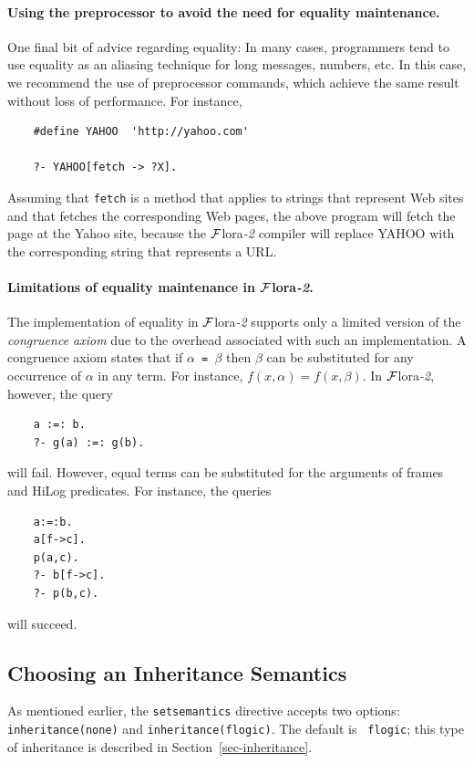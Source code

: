 \documentclass[11pt]{article}
\newcommand{\FLSYSTEM}{{\mbox{\sc ${\cal F}${lora}\rm\emph{-2}}}\xspace}
\begin{document}
\paragraph{Using the preprocessor to avoid the need for equality maintenance.}
One final bit of advice regarding equality: In many cases, programmers tend to use
equality as an aliasing technique for long messages, numbers, etc. In this
case, we recommend the use of preprocessor commands, which achieve the same
result without loss of performance. For instance,

\begin{verbatim}
    #define YAHOO  'http://yahoo.com'  

    ?- YAHOO[fetch -> ?X].
\end{verbatim}
\noindent
Assuming that {\tt fetch} is a method that applies to strings that
represent Web sites and that fetches the corresponding Web pages, the above
program will fetch the page at the Yahoo site, because the \FLSYSTEM compiler will
replace YAHOO with the corresponding string that represents a URL.

\paragraph{Limitations of equality maintenance in \FLSYSTEM.}
The implementation of equality in \FLSYSTEM supports only a limited
version of the
\emph{congruence axiom} due to the overhead associated with such an
implementation. A congruence axiom states that if {\tt $\alpha$ = $\beta$}
then {\tt $\beta$} can be substituted for any occurrence of $\alpha$ in any
term. For instance, $f(x,\alpha) = f(x,\beta)$. In \FLSYSTEM, however, the query
\begin{verbatim}
    a :=: b.
    ?- g(a) :=: g(b).
\end{verbatim}
will fail. However,
equal terms can be substituted for the arguments of
frames and HiLog predicates. For instance, the queries
\begin{verbatim}
    a:=:b.
    a[f->c].
    p(a,c).
    ?- b[f->c].  
    ?- p(b,c).
\end{verbatim}
will succeed.


\subsection{Choosing an Inheritance Semantics}\label{sec-inheritance-directive}

As mentioned earlier, the {\tt setsemantics} directive accepts two options:
{\tt inheritance(none)} and {\tt inheritance(flogic)}.  The default is {\tt
  flogic}; this type of inheritance is described in
Section~\ref{sec-inheritance}.
\end{document}
